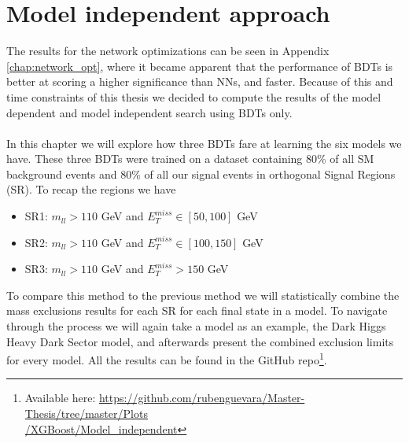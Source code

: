 \documentclass[12pt, a4paper]{book}
\begin{document}
\chapter{Model independent approach}\label{chap:Best_ML_MI}
The results for the network optimizations can be seen in Appendix \ref{chap:network_opt}, where it became apparent that the performance of BDTs is better at scoring a higher significance than NNs, and faster. Because of this and time constraints of this thesis 
we decided to compute the results of the model dependent and model independent search using BDTs only. \\\\
In this chapter we will explore how three BDTs fare at learning the six models we have. These three BDTs were trained on a dataset containing 80\% of all SM background events and 80\% of all our signal events in orthogonal Signal Regions (SR). To recap the regions we have
\begin{itemize}
   \item SR1: $m_{ll} >110$ GeV and $E_T^{miss} \in [50, 100]$ GeV
   \item SR2: $m_{ll} >110$ GeV and $E_T^{miss} \in [100, 150]$ GeV
   \item SR3: $m_{ll} >110$ GeV and $E_T^{miss} >150$ GeV
\end{itemize}
To compare this method to the previous method we will statistically combine the mass exclusions results for each SR for each final state in a model. To navigate through the process we will again take a model as an example, the Dark Higgs Heavy Dark Sector model, 
and afterwards present the combined exclusion limits for every model. All the results can be found in the GitHub repo\footnote{Available here: \href{https://github.com/rubenguevara/Master-Thesis/tree/master/Plots/XGBoost/Model_independent}{https://github.com/rubenguevara/Master-Thesis/tree/master/Plots\\/XGBoost/Model\_independent}}. 

\clearpage
\graphicspath{{../../../Plots/}}
\end{document}
